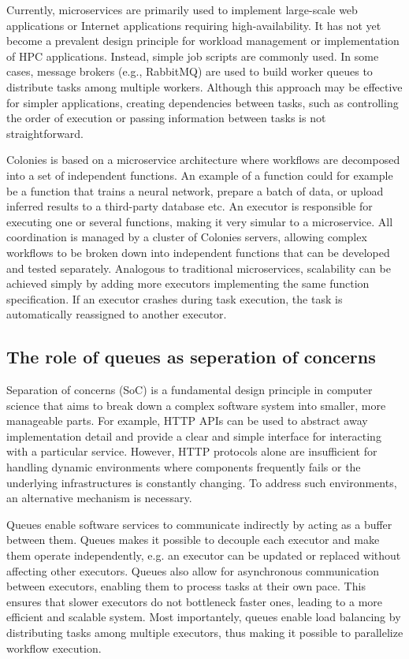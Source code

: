 \documentclass{article}
\begin{document}
Currently, microservices are primarily used to implement large-scale web applications or Internet applications requiring high-availability. It has not yet become a prevalent design principle for workload management or implementation of HPC applications. Instead, simple job scripts are commonly used. In some cases, message brokers (e.g., RabbitMQ) are used to build worker queues to distribute tasks among multiple workers. Although this approach may be effective for simpler applications, creating dependencies between tasks, such as controlling the order of execution or passing information between tasks is not straightforward.

Colonies is based on a microservice architecture where workflows are decomposed into a set of independent functions. An example of a function could for example be a function that trains a neural network, prepare a batch of data, or upload inferred results to a third-party database etc. An executor is responsible for executing one or several functions, making it very simular to a microservice. All coordination is managed by a cluster of Colonies servers, allowing complex workflows to be broken down into independent functions that can be developed and tested separately. Analogous to traditional microservices, scalability can be achieved simply by adding more executors implementing the same function specification. If an executor crashes during task execution, the task is automatically reassigned to another executor. 

\subsection{The role of queues as seperation of concerns}
Separation of concerns (SoC) is a fundamental design principle in computer science that aims to break down a complex software system into smaller, more manageable parts. For example, HTTP APIs can be used to abstract away implementation detail and provide a clear and simple interface for interacting with a particular service. However, HTTP protocols alone are insufficient for handling dynamic environments where components frequently fails or the underlying infrastructures is constantly changing. To address such environments, an alternative mechanism is necessary. 

Queues enable software services to communicate indirectly by acting as a buffer between them. Queues makes it possible to decouple each executor and make them operate independently, e.g. an executor can be updated or replaced without affecting other executors. Queues also allow for asynchronous communication between executors, enabling them to process tasks at their own pace. This ensures that slower executors do not bottleneck faster ones, leading to a more efficient and scalable system. Most importantely, queues enable load balancing by distributing tasks among multiple executors, thus making it possible to parallelize workflow execution. 
\end{document}
